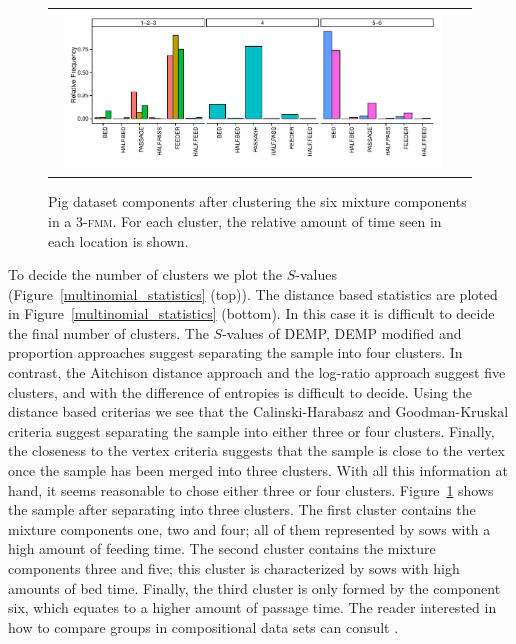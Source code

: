 \documentclass[submit]{smj}
\theoremstyle{definition}
\newcommand{\fmm}{\textsc{fmm}\xspace}
\begin{document}
\begin{figure}[htpb]
\begin{center}
\begin{tabular}{cc}
  \includegraphics[width=0.95\textwidth]{figures/multinomial_clust3_all.pdf} \\
 \end{tabular}
 \caption{Pig dataset components after clustering the six mixture components in a 3-\fmm. For each cluster, the relative amount of time seen in each location is shown.}\label{multinomial_clust3}
\end{center}
\end{figure}

To decide the number of clusters we plot the $S$-values (Figure~\ref{multinomial_statistics} (top)). The distance based statistics are ploted in Figure~\ref{multinomial_statistics} (bottom). In this case it is difficult to decide the final number of clusters. The $S$-values of DEMP, DEMP modified and proportion approaches suggest separating the sample into four clusters. In contrast, the Aitchison distance approach and the log-ratio approach suggest five clusters, and with the difference of entropies is difficult to decide. Using the distance based criterias we see that the Calinski-Harabasz and Goodman-Kruskal criteria suggest separating the sample into either three or four clusters. Finally, the closeness to the vertex criteria suggests that the sample is close to the vertex once the sample has been merged into three clusters. With all this information at hand, it seems reasonable to chose either three or four clusters.  Figure~\ref{multinomial_clust3}  shows the sample after separating into three clusters. The first cluster contains the mixture components one, two and four; all of them represented by sows with a high amount of feeding time. The second cluster contains the mixture components three and five; this cluster is characterized by sows with high amounts of bed time. Finally, the third cluster is only formed by the component six, which equates to a higher amount of passage time. The reader interested in how to compare groups in compositional data sets can consult \cite{MDM15manova}.
\end{document}
